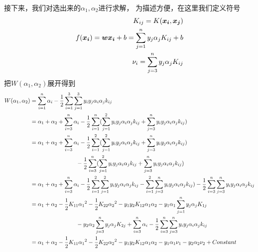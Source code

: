 \documentclass[UTF8]{ctexart}
\begin{document}
接下来，我们对选出来的$\alpha_1,\alpha_2$进行求解，
为描述方便，在这里我们定义符号
\begin{equation}\notag
    \begin{aligned}
        K_{ij}=K(\boldsymbol{x_i},\boldsymbol{x_j}) \\
        f(\boldsymbol{x_i})=\boldsymbol w \boldsymbol{x_i} + b=\sum_{j=1}^n y_j\alpha_j K_{ij} +b \\
        \nu_i=\sum_{j=3}^n y_j \alpha_j K_{ij}
    \end{aligned}
\end{equation}
把$W(\alpha_1,\alpha_2)$展开得到
\begin{equation}\notag
    \begin{aligned}
       W(\alpha_1,\alpha_2) &=\sum_{i=1}^n \alpha_i - \frac{1}{2} \sum_{i=1}^3\sum_{j=1}^3 y_i y_j \alpha_i \alpha_j k_{ij} \\
       &=\alpha_1 + \alpha_2 + \sum_{i=3}^n\alpha_i  - \frac{1}{2} \sum_{i=1}^n(\sum_{j=1}^2 y_i y_j \alpha_i \alpha_j k_{ij} + \sum_{j=3}^n y_i y_j \alpha_i \alpha_j k_{ij})\\
       &=\alpha_1 + \alpha_2 + \sum_{i=3}^n\alpha_i - \frac{1}{2} \sum_{i=1}^2 (\sum_{j=1}^2 y_i y_j \alpha_i \alpha_j k_{ij} + \sum_{j=3}^n y_i y_j \alpha_i \alpha_j k_{ij}) \\
       &\qquad \qquad \qquad \quad \quad - \frac{1}{2} \sum_{i=3}^n(\sum_{j=1}^2 y_i y_j \alpha_i \alpha_j k_{ij} + \sum_{j=3}^n y_i y_j \alpha_i \alpha_j k_{ij}) \\
       &=\alpha_1 + \alpha_2 + \sum_{i=3}^n\alpha_i - \frac{1}{2} \sum_{i=1}^2 \sum_{j=1}^2 y_i y_j \alpha_i \alpha_j k_{ij} - \sum_{i=1}^2\sum_{j=3}^n y_i y_j \alpha_i \alpha_j k_{ij}) - \frac{1}{2} \sum_{i=3}^n\sum_{j=3}^n y_i y_j \alpha_i \alpha_j k_{ij} \\
       &=\alpha_1 + \alpha_2 - \frac{1}{2}K_{11}{\alpha_1}^2- \frac{1}{2}K_{22}{\alpha_2}^2 - y_1y_2K_{12}\alpha_1\alpha_2 -y_1\alpha_1 \sum_{j=1}^n y_j\alpha_j K_{1j} \\
       &\qquad \qquad \qquad \quad \quad -y_2\alpha_2\sum_{j=3}^n y_j\alpha_j K_{2j} + \sum_{i=3}^n\alpha_i - \frac{1}{2}\sum_{i=3}^n\sum_{j=3}^n y_i y_j \alpha_i \alpha_j k_{ij}\\
       &=\alpha_1 + \alpha_2 - \frac{1}{2}K_{11}{\alpha_1}^2-\frac{1}{2}K_{22}{\alpha_2}^2- y_1y_2K_{12}\alpha_1\alpha_2 - y_1\alpha_1\nu_1 - y_2\alpha_2\nu_2 + Constant
    \end{aligned}
\end{equation}
\end{document}
